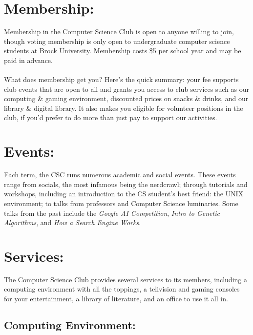 \documentclass[10pt,letterpaper]{article}
\begin{document}
\pagestyle{empty}

\begin{multicols}{3}

\section*{Membership:}

Membership in the Computer Science Club is open to anyone willing to join,
though voting membership is only open to undergraduate computer science students at
Brock University. Membership costs \$5 per school year and may be paid in advance.\\
\\
What does membership get you? Here's the quick summary: your fee supports club events that are
open to all and grants you access to club services such as our computing \& gaming environment,
discounted prices on snacks \& drinks, and our library \& digital library.
It also makes you eligible for volunteer positions in the club,
if you'd prefer to do more than just pay to support our activities.

\section*{Events:} 

Each term, the CSC runs numerous academic and social events.
These events range from socials, the most infamous being the nerdcrawl;
through tutorials and workshops, including an introduction to the CS student's best
friend: the UNIX environment; to talks from professors and Computer Science
luminaries. Some talks from the past include the \emph{Google AI Competition},
\emph{Intro to Genetic Algorithms}, and \emph{How a Search Engine Works}.


\section*{Services:}

The Computer Science Club provides several services to its members, including
a computing environment with all the toppings, a telivision and gaming consoles
for your entertainment, a library of literature, and an office to use it all in.

\subsection*{Computing Environment:}


\end{multicols}
\end{document}
